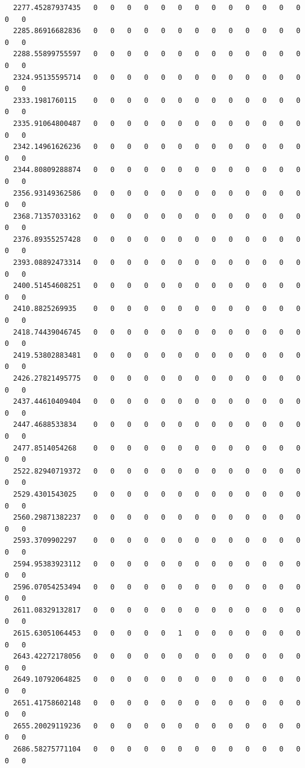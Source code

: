 \documentclass[
  letterpaper,
  DIV=11,
  numbers=noendperiod]{scrartcl}
\begin{document}
\begin{verbatim}
  2277.45287937435   0   0   0   0   0   0   0   0   0   0   0   0   0   0   0
  2285.86916682836   0   0   0   0   0   0   0   0   0   0   0   0   0   0   0
  2288.55899755597   0   0   0   0   0   0   0   0   0   0   0   0   0   0   0
  2324.95135595714   0   0   0   0   0   0   0   0   0   0   0   0   0   0   0
  2333.1981760115    0   0   0   0   0   0   0   0   0   0   0   0   0   0   0
  2335.91064800487   0   0   0   0   0   0   0   0   0   0   0   0   0   0   0
  2342.14961626236   0   0   0   0   0   0   0   0   0   0   0   0   0   0   0
  2344.80809288874   0   0   0   0   0   0   0   0   0   0   0   0   0   0   0
  2356.93149362586   0   0   0   0   0   0   0   0   0   0   0   0   0   0   0
  2368.71357033162   0   0   0   0   0   0   0   0   0   0   0   0   0   0   0
  2376.89355257428   0   0   0   0   0   0   0   0   0   0   0   0   0   0   0
  2393.08892473314   0   0   0   0   0   0   0   0   0   0   0   0   0   0   0
  2400.51454608251   0   0   0   0   0   0   0   0   0   0   0   0   0   0   0
  2410.8825269935    0   0   0   0   0   0   0   0   0   0   0   0   0   0   0
  2418.74439046745   0   0   0   0   0   0   0   0   0   0   0   0   0   0   0
  2419.53802883481   0   0   0   0   0   0   0   0   0   0   0   0   0   0   0
  2426.27821495775   0   0   0   0   0   0   0   0   0   0   0   0   0   0   0
  2437.44610409404   0   0   0   0   0   0   0   0   0   0   0   0   0   0   0
  2447.4688533834    0   0   0   0   0   0   0   0   0   0   0   0   0   0   0
  2477.8514054268    0   0   0   0   0   0   0   0   0   0   0   0   0   0   0
  2522.82940719372   0   0   0   0   0   0   0   0   0   0   0   0   0   0   0
  2529.4301543025    0   0   0   0   0   0   0   0   0   0   0   0   0   0   0
  2560.29871382237   0   0   0   0   0   0   0   0   0   0   0   0   0   0   0
  2593.3709902297    0   0   0   0   0   0   0   0   0   0   0   0   0   0   0
  2594.95383923112   0   0   0   0   0   0   0   0   0   0   0   0   0   0   0
  2596.07054253494   0   0   0   0   0   0   0   0   0   0   0   0   0   0   0
  2611.08329132817   0   0   0   0   0   0   0   0   0   0   0   0   0   0   0
  2615.63051064453   0   0   0   0   0   1   0   0   0   0   0   0   0   0   0
  2643.42272178056   0   0   0   0   0   0   0   0   0   0   0   0   0   0   0
  2649.10792064825   0   0   0   0   0   0   0   0   0   0   0   0   0   0   0
  2651.41758602148   0   0   0   0   0   0   0   0   0   0   0   0   0   0   0
  2655.20029119236   0   0   0   0   0   0   0   0   0   0   0   0   0   0   0
  2686.58275771104   0   0   0   0   0   0   0   0   0   0   0   0   0   0   0

\end{verbatim}
\end{document}
